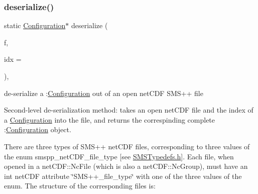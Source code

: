 \subsubsection{\texorpdfstring{deserialize()}{deserialize()}\hspace{0.1cm}{\footnotesize\ttfamily [2/3]}}
{\footnotesize\ttfamily static \mbox{\hyperlink{class_s_m_spp__di__unipi__it_1_1_configuration}{Configuration}}$\ast$ deserialize (\begin{DoxyParamCaption}\item[{net\+C\+D\+F\+::\+Nc\+File \&\&}]{f,  }\item[{const unsigned int}]{idx = {} }\end{DoxyParamCaption})\hspace{0.3cm}{\ttfamily [inline]}, {\ttfamily [static]}}



de-\/serialize a \+:\mbox{\hyperlink{class_s_m_spp__di__unipi__it_1_1_configuration}{Configuration}} out of an open net\+C\+DF S\+M\+S++ file 

Second-\/level de-\/serialization method\+: takes an open net\+C\+DF file and the index of a \mbox{\hyperlink{class_s_m_spp__di__unipi__it_1_1_configuration}{Configuration}} into the file, and returns the correspinding complete \+:\mbox{\hyperlink{class_s_m_spp__di__unipi__it_1_1_configuration}{Configuration}} object.

There are three types of S\+M\+S++ net\+C\+DF files, corresponding to three values of the enum smspp\+\_\+net\+C\+D\+F\+\_\+file\+\_\+type \mbox{[}see \mbox{\hyperlink{_s_m_s_typedefs_8h}{S\+M\+S\+Typedefs.\+h}}\mbox{]}. Each file, when opened in a net\+C\+D\+F\+::\+Nc\+File (which is also a net\+C\+D\+F\+::\+Nc\+Group), must have an int net\+C\+DF attribute \char`\"{}\+S\+M\+S++\+\_\+file\+\_\+type\char`\"{} with one of the three values of the enum. The structure of the corresponding files is\+:


